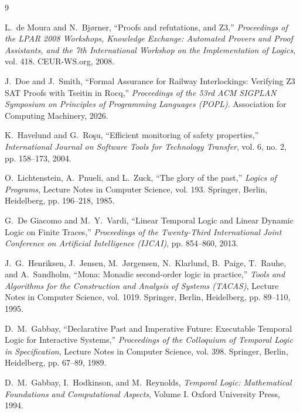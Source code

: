 \documentclass{article}
\begin{document}
\newpage
\begin{thebibliography}{9}

L.~de Moura and N.~Bj{\o}rner, 
``Proofs and refutations, and {Z3},'' 
\emph{Proceedings of the LPAR 2008 Workshops, Knowledge Exchange: Automated Provers and Proof Assistants, and the 7th International Workshop on the Implementation of Logics}, vol. 418. CEUR-WS.org, 2008.

J.~Doe and J.~Smith, 
``Formal Assurance for Railway Interlockings: Verifying {Z3} {SAT} Proofs with {Tseitin} in {Rocq},'' 
\emph{Proceedings of the 53rd ACM SIGPLAN Symposium on Principles of Programming Languages (POPL)}. Association for Computing Machinery, 2026.

K.~Havelund and G.~Ro\c{s}u, 
``Efficient monitoring of safety properties,'' 
\emph{International Journal on Software Tools for Technology Transfer}, vol. 6, no. 2, pp. 158--173, 2004.

O.~Lichtenstein, A.~Pnueli, and L.~Zuck, 
``The glory of the past,'' 
\emph{Logics of Programs}, Lecture Notes in Computer Science, vol. 193. Springer, Berlin, Heidelberg, pp. 196--218, 1985.

G.~De Giacomo and M.~Y.~Vardi,
``Linear Temporal Logic and Linear Dynamic Logic on Finite Traces,''
\emph{Proceedings of the Twenty-Third International Joint Conference on Artificial Intelligence (IJCAI)}, pp. 854--860, 2013.

J.~G.~Henriksen, J.~Jensen, M.~J{\o}rgensen, N.~Klarlund, B.~Paige, T.~Rauhe, and A.~Sandholm,
``Mona: Monadic second-order logic in practice,''
\emph{Tools and Algorithms for the Construction and Analysis of Systems (TACAS)}, Lecture Notes in Computer Science, vol. 1019. Springer, Berlin, Heidelberg, pp. 89--110, 1995.

D.~M.~Gabbay,
``Declarative Past and Imperative Future: Executable Temporal Logic for Interactive Systems,''
\emph{Proceedings of the Colloquium of Temporal Logic in Specification}, Lecture Notes in Computer Science, vol. 398. Springer, Berlin, Heidelberg, pp. 67--89, 1989.

D.~M.~Gabbay, I.~Hodkinson, and M.~Reynolds,
\emph{Temporal Logic: Mathematical Foundations and Computational Aspects}, Volume I. Oxford University Press, 1994.

\end{thebibliography}
\end{document}
